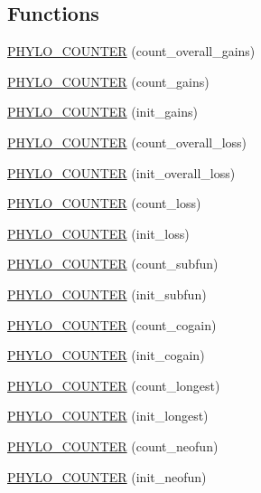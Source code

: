 \subsection*{Functions}
\begin{DoxyCompactItemize}
\item 
\hyperlink{namespacebarray_1_1counters_1_1phylo_acb8de876a0663946d909f3410799cd81}{P\+H\+Y\+L\+O\+\_\+\+C\+O\+U\+N\+T\+ER} (count\+\_\+overall\+\_\+gains)
\item 
\hyperlink{namespacebarray_1_1counters_1_1phylo_a7625a062e8a15d4ddd786e5f371de305}{P\+H\+Y\+L\+O\+\_\+\+C\+O\+U\+N\+T\+ER} (count\+\_\+gains)
\item 
\hyperlink{namespacebarray_1_1counters_1_1phylo_a21aa9700c46d81668e65201c36d73e32}{P\+H\+Y\+L\+O\+\_\+\+C\+O\+U\+N\+T\+ER} (init\+\_\+gains)
\item 
\hyperlink{namespacebarray_1_1counters_1_1phylo_a76f1c4b15d5d9b11ea9215185cc53e50}{P\+H\+Y\+L\+O\+\_\+\+C\+O\+U\+N\+T\+ER} (count\+\_\+overall\+\_\+loss)
\item 
\hyperlink{namespacebarray_1_1counters_1_1phylo_acf9f3025be1a9aea38549577efaf2ff5}{P\+H\+Y\+L\+O\+\_\+\+C\+O\+U\+N\+T\+ER} (init\+\_\+overall\+\_\+loss)
\item 
\hyperlink{namespacebarray_1_1counters_1_1phylo_adda6a3750e1b5457d3ff4d9816c25bb7}{P\+H\+Y\+L\+O\+\_\+\+C\+O\+U\+N\+T\+ER} (count\+\_\+loss)
\item 
\hyperlink{namespacebarray_1_1counters_1_1phylo_a07eda883d5e790ab4172e14bcbf10e99}{P\+H\+Y\+L\+O\+\_\+\+C\+O\+U\+N\+T\+ER} (init\+\_\+loss)
\item 
\hyperlink{namespacebarray_1_1counters_1_1phylo_ac63bc3f1b6a7e001fa058eb03c7573b6}{P\+H\+Y\+L\+O\+\_\+\+C\+O\+U\+N\+T\+ER} (count\+\_\+subfun)
\item 
\hyperlink{namespacebarray_1_1counters_1_1phylo_a66f0e5117aadd3739e978bace0069e5c}{P\+H\+Y\+L\+O\+\_\+\+C\+O\+U\+N\+T\+ER} (init\+\_\+subfun)
\item 
\hyperlink{namespacebarray_1_1counters_1_1phylo_a9c04943d8d2b2c1760a5214d0cfca9b6}{P\+H\+Y\+L\+O\+\_\+\+C\+O\+U\+N\+T\+ER} (count\+\_\+cogain)
\item 
\hyperlink{namespacebarray_1_1counters_1_1phylo_a54f742939eeb4ccbc844d85834fec82d}{P\+H\+Y\+L\+O\+\_\+\+C\+O\+U\+N\+T\+ER} (init\+\_\+cogain)
\item 
\hyperlink{namespacebarray_1_1counters_1_1phylo_a945acd6c0dbef920937efdf33a849bb9}{P\+H\+Y\+L\+O\+\_\+\+C\+O\+U\+N\+T\+ER} (count\+\_\+longest)
\item 
\hyperlink{namespacebarray_1_1counters_1_1phylo_afc8017e2d638c34c9121177829040080}{P\+H\+Y\+L\+O\+\_\+\+C\+O\+U\+N\+T\+ER} (init\+\_\+longest)
\item 
\hyperlink{namespacebarray_1_1counters_1_1phylo_ad16808694568c93502b3fdb3e2d7fef1}{P\+H\+Y\+L\+O\+\_\+\+C\+O\+U\+N\+T\+ER} (count\+\_\+neofun)
\item 
\hyperlink{namespacebarray_1_1counters_1_1phylo_a15ca86d95dc04026cd0202e1df42baf5}{P\+H\+Y\+L\+O\+\_\+\+C\+O\+U\+N\+T\+ER} (init\+\_\+neofun)
\end{DoxyCompactItemize}
